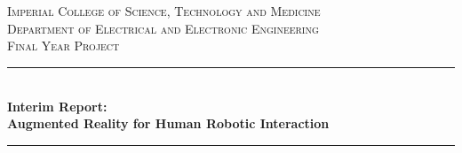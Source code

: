 \documentclass[12pt,a4paper]{report}
\begin{document}
\begin{titlepage}


\newcommand{\HRule}{\rule{\linewidth}{0.5mm}} %
\setlength{\topmargin}{0in}
\center %
 
\vspace*{-3cm}
 
\begin{minipage}{0.4\textwidth}
\begin{flushleft} \large
\hspace*{-0.5cm}
\end{flushleft}
\end{minipage}
~
\begin{minipage}{0.5\textwidth}
\begin{flushright} \large
\hspace*{2cm}
\end{flushright}
\end{minipage}\\[1cm]

\textsc{\LARGE Imperial College of Science, Technology and Medicine}\\[1.5cm] %
\textsc{\Large Department of Electrical and Electronic Engineering}\\[0.8cm] %
\textsc{\Large  Final Year Project}\\[0.8cm] %


\addvspace{1.8em}

\HRule \\[0.2cm]
{ \huge \bfseries Interim Report:\\ Augmented Reality for Human Robotic Interaction }\\[0.2cm] %
\HRule \\[1cm]
 


\end{titlepage}
\end{document}
